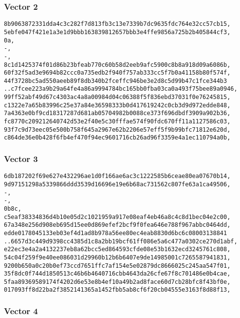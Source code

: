 \documentclass[
]{article}
\begin{document}
\subsubsection{Vector 2}\label{vector-2-1}

\begin{verbatim}
8b9063872331dda4c3c282f7d813fb3c13e7339b7dc9635fdc764e32cc57cb15,
5ebfe047f421e1a3e1d9bbb163839812657bbb3e4ffe9856a725b2b405844cf3,
0a,
-,
-,
8c1d1425374f01d86b23bfeab770c60b58d2eeb9afc5900c8b8a918d09a6086b,
60f32f5ad3e9694b82ccc0a735edb2f940f757ab333cc5f7b0a41158b80f574f,
44f3728bc5ad550aeeb89f8db340b2fceffc946be3e2d8c5d99b47c1fce344b3
..c7fcee223a9b29a64fe4a86a9994784bc165bb0fba03ca0a493f75bee89a0946,
99ff52abf49d67c4303ac4a8a00984d04c06388f5f836ebd37031f0e76245815,
c1322e7a65b83996c25e37a84e36598333b0d417619242c0cb3d9d972edde848,
7a4363e0bf9cd18317287d681ab05704982b0088ce373f696dbdf3909a902b36,
fc8770c209212640742d53e2f40e5c30fffae574f90fdc670ff11a1127586c03,
93f7c9d73eec05e500b758f645a2967e62b2206e57eff5f9b99bfc71812e620d,
c864de36e0b428f6fb4ef470f94ec9601716cb26ad96f3359e4a1ec110794a0b,
\end{verbatim}

\subsubsection{Vector 3}\label{vector-3-1}

\begin{verbatim}
6db187202f69e627e432296ae1d0f166ae6ac3c1222585b6ceae80ea07670b14,
9d97151298a5339866ddd3539d16696e19e6b68ac731562c807fe63a1ca49506,
-,
-,
0b8c,
c5eaf38334836d4b10e05d2c1021959a917e08eaf4eb46a8c4c8d1bec04e2c00,
67a348e256d908eb695d15ee0d869efef2bcf9f0fea646e788f967abbc0464dd,
edde0178045133eb03ef4d1ad8b978a56ee80ec4eab8830d6bc6c08003138841
..6657d3c449d9398cc4385d1c8a2bb19bcf61ff086e5a6c477a0302ce270d1abf,
e22ec3e4a2a4132237eb8a62bcc5ed864593cfde08e53b1632ecd3245761c808,
54c04f259f9e40ee086031d29960b12b6b6407e9de14985001c7265587941831,
9200b650a0c20b0ef73ccd7651ffc7af154e5e02879dc8666025c245aa547f01,
35f8dc0f744d1850513c46b6b4640716cbb4643da26cfe67f8c701486e0b4cae,
5faa89369589174f4202d6e53e8b4ef10a49b2ad8face60d7cb28bfc8f43bf0e,
017093ff8d22ba2f3852141365a1452fbb5ab8cf6f20cb04555e3163f8d88f13,
\end{verbatim}

\subsubsection{Vector 4}\label{vector-4-1}
\end{document}
